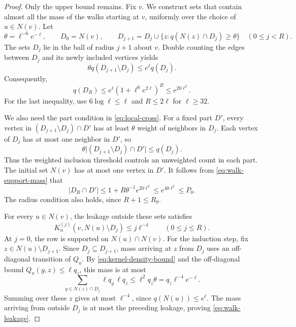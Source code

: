 \begin{proof}
Only the upper bound remains.  Fix $v$.  We construct sets that contain
almost all the mass of the walks starting at $v$, uniformly over the
choice of $u\in N(v)$.  Let
\[
 \theta=\ell^{-6}e^{-\ell},\qquad D_0=N(v),\qquad
 D_{j+1}=D_j\cup\{z:q(N(z)\cap D_j)\ge\theta\}
                      \quad(0\le j<R).
\]
The sets $D_j$ lie in the ball of radius $j+1$ about $v$.  Double counting
the edges between $D_j$ and its newly included vertices yields
\[
 \theta q(D_{j+1}\setminus D_j)\le e^\ell q(D_j).
\]
Consequently,
\begin{equation}
 q(D_R)\le e^\ell(1+\ell^6e^{2\ell})^R\le e^{20\ell^2}.
 \label{eq:walk-support-mass}
\end{equation}
For the last inequality, use $6\log\ell\le\ell$ and $R\le2\ell$ for
$\ell\ge32$.

We also need the part condition in \eqref{eq:local-cross}.  For a fixed
part $D'$, every vertex in $(D_{j+1}\setminus D_j)\cap D'$ has at least
$\theta$ weight of neighbors in $D_j$.  Each vertex of $D_j$ has at
most one neighbor in $D'$, so
\[
 \theta\bigl|(D_{j+1}\setminus D_j)\cap D'\bigr|\le q(D_j).
\]
Thus the weighted inclusion threshold controls an unweighted count in
each part.  The initial set $N(v)$ has at most one vertex in $D'$.  It follows from
\eqref{eq:walk-support-mass} that
\begin{equation}
 |D_R\cap D'|\le1+R\theta^{-1}e^{20\ell^2}
       \le e^{40\ell^2}\le P_0.
 \label{eq:walk-support-parts}
\end{equation}
The radius condition also holds, since $R+1\le R_0$.

For every $u\in N(v)$, the leakage outside these sets satisfies
\begin{equation}
 K_u^{(j)}(v,N(u)\setminus D_j)\le j\ell^{-4}
                          \qquad(0\le j\le R).
 \label{eq:walk-leakage}
\end{equation}
At $j=0$, the row is supported on $N(u)\cap N(v)$.  For the induction
step, fix $z\in N(u)\setminus D_{j+1}$.  Since $D_j\subseteq D_{j+1}$,
mass arriving at $z$ from $D_j$ uses an off-diagonal transition of $Q_u$.
By \eqref{eq:kernel-density-bound} and the off-diagonal bound
$Q_u(y,z)\le\ell q_z$, this mass is at most
\[
 \sum_{y\in N(z)\cap D_j}\ell q_y\,\ell q_z
 \le \ell^2q_z\theta
 =q_z\ell^{-4}e^{-\ell}.
\]
Summing over these $z$ gives at most $\ell^{-4}$, since $q(N(u))\le
e^\ell$.  The mass arriving from outside $D_j$ is at most the preceding
leakage, proving \eqref{eq:walk-leakage}.


\end{proof}
